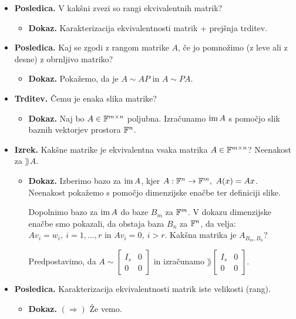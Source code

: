 \begin{enumerate}
\begin{itemize}
        \item \colorbox{orange!30}{\textbf{Posledica.}} V kakšni zvezi so rangi ekvivalentnih matrik?
        \begin{itemize}
            \item \colorbox{green!30}{\textbf{Dokaz.}} Karakterizacija ekvivalentnosti matrik + prejšnja trditev.
        \end{itemize}
        \item \colorbox{orange!30}{\textbf{Posledica.}} Kaj se zgodi z rangom matrike $A$, če jo pomnožimo (z leve ali z desne) z obrnljivo matriko?
        \begin{itemize}
            \item \colorbox{green!30}{\textbf{Dokaz.}} Pokažemo, da je $A \sim AP$ in $A \sim PA$.
        \end{itemize}
        \item \colorbox{blue!30}{\textbf{Trditev.}} Čemu je enaka slika matrike?
        \begin{itemize}
            \item \colorbox{green!30}{\textbf{Dokaz.}} Naj bo $A \in \mathbb{F}^{m \times n}$ poljubna. Izračunamo $\operatorname{im} A$ s pomočjo slik baznih vektorjev prostora $\mathbb{F}^n$.
        \end{itemize}
        \item \colorbox{blue!30}{\textbf{Izrek.}} Kakšne matrike je ekvivalentna vsaka matrika $A \in \mathbb{F}^{m \times n}$? Neenakost za $\rang A$.
        \begin{itemize}
            \item \colorbox{green!30}{\textbf{Dokaz.}} Izberimo bazo za $\operatorname{im} A$, kjer $A: \mathbb{F}^n \to \mathbb{F}^m, \ A(x) = Ax$. Neenakost pokažemo s pomočjo dimenzijske enačbe ter definiciji slike.
            
            Dopolnimo bazo za $\operatorname{im} A$ do baze $B_m$ za $\mathbb{F}^m$. V dokazu dimenzijske enačbe smo pokazali, da obstaja baza $B_n$ za $\mathbb{F}^n$, da velja: $Av_i = w_i, \ i = 1, \ldots, r$ in $Av_i = 0, \ i > r$. Kakšna matrika je $A_{B_m, B_n}$?

            Predpostavimo, da $A \sim \begin{bmatrix}
                I_s & 0 \\ 0 & 0
            \end{bmatrix}$ in izračunamo $\rang \begin{bmatrix}
                I_s & 0 \\ 0 & 0
            \end{bmatrix}$.
        \end{itemize}        
        \item \colorbox{orange!30}{\textbf{Posledica.}} Karakterizacija ekvivalentnosti matrik iste velikosti (rang).
        \begin{itemize}
            \item \colorbox{green!30}{\textbf{Dokaz.}} $(\Rightarrow)$ Že vemo.
            

\end{itemize}
\end{itemize}
\end{enumerate}
